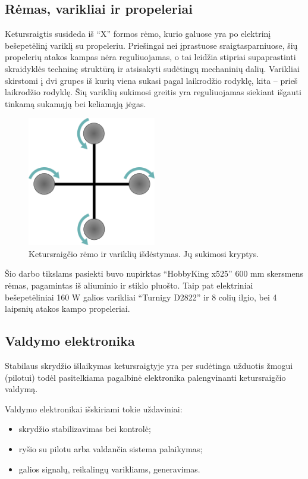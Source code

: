 \documentclass[12pt, a4paper, lithuanian, final]{article}
\begin{document}
\subsection{Rėmas, varikliai ir propeleriai}
Ketursraigtis susideda iš "`X"' formos rėmo, kurio galuose yra po elektrinį bešepetėlinį variklį su propeleriu.
Priešingai nei įprastuose sraigtasparniuose, šių propelerių atakos kampas nėra reguliuojamas, o tai leidžia stipriai supaprastinti skraidyklės techninę struktūrą ir atsisakyti sudėtingų mechaninių dalių.
Varikliai skirstomi į dvi grupes iš kurių viena sukasi pagal laikrodžio rodyklę, kita -- prieš laikrodžio rodyklę.
Šių variklių sukimosi greitis yra reguliuojamas siekiant išgauti tinkamą sukamąją bei keliamąją jėgas.

\begin{figure}[H]
\begin{center}
\includegraphics[width=0.5\textwidth]{img/rotor-direction.png}
\caption{Ketursraigčio rėmo ir variklių išdėstymas. Jų sukimosi kryptys.}
\end{center}
\end{figure}

Šio darbo tikslams pasiekti buvo nupirktas "`HobbyKing x525"' 600 mm skersmens rėmas, pagamintas iš aliuminio ir stiklo pluošto.
Taip pat elektriniai bešepetėliniai 160 W galios varikliai "`Turnigy D2822"' ir 8 colių ilgio, bei 4 laipsnių atakos kampo propeleriai.


\subsection{Valdymo elektronika}
Stabilaus skrydžio išlaikymas ketursraigtyje yra per sudėtinga užduotis žmogui (pilotui) todėl pasitelkiama pagalbinė elektronika palengvinanti ketursraigčio valdymą.

Valdymo elektronikai išskiriami tokie uždaviniai:
\begin{itemize}
	\item skrydžio stabilizavimas bei kontrolė;
	\item ryšio su pilotu arba valdančia sistema palaikymas;
	\item galios signalų, reikalingų varikliams, generavimas.
\end{itemize}
\end{document}
